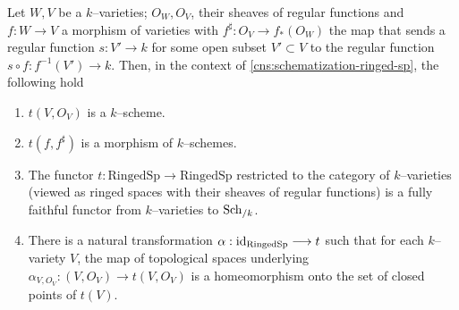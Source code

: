 \begin{thm}\label{thm:scheme-of-var}
Let $W, V$ be a $k$--varieties;
$O_W, O_V$, their sheaves of regular functions and $f : W \to V$
a morphism of varieties with $f^\sharp : O_V \to f_*(O_W)$ the map
that sends a regular function $s : V' \to k$ for some open subset
$V' \subset V$ to the regular function $s \circ f : f^{-1}(V') \to k$.
Then, in the context of \cref{cns:schematization-ringed-sp},
the following hold
\begin{enumerate}
\item $t(V, O_V)$ is a $k$--scheme.
\item $t(f, f^\sharp)$ is a morphism of $k$--schemes.
\item The functor
$t : \mathrm{RingedSp} \to \mathrm{RingedSp}$ restricted to
the category of $k$--varieties (viewed as ringed spaces with their
sheaves of regular functions) is a fully faithful functor
from $k$--varieties to $\mathrm{Sch}_{/k}$.
\item There is a natural transformation
$\alpha : \id_{\mathrm{RingedSp}} \to t$ such that for each $k$--variety
$V$, the map of topological spaces underlying
$\alpha_{V, O_V} : (V, O_V) \to t(V, O_V)$
is a homeomorphism onto the set of closed points of $t(V)$.
\end{enumerate}
\end{thm}
